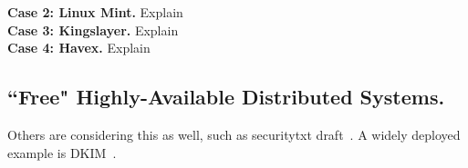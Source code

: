 \noindent\textbf{Case 2: Linux Mint.} Explain \\

\noindent\textbf{Case 3: Kingslayer.} Explain \\

\noindent\textbf{Case 4: Havex.} Explain \\

\subsection{``Free" Highly-Available Distributed Systems.}

Others are considering this as well, such as securitytxt
draft~\cite{draft-sectxt}. A widely deployed example is DKIM~\cite{DKIM}.
